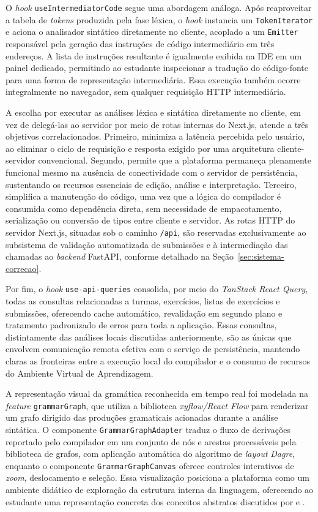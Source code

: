 O \textit{hook} \texttt{useIntermediatorCode} segue uma abordagem análoga. Após reaproveitar a tabela de \textit{tokens} produzida pela fase léxica, o \textit{hook} instancia um \texttt{TokenIterator} e aciona o analisador sintático diretamente no cliente, acoplado a um \texttt{Emitter} responsável pela geração das instruções de código intermediário em três endereços. A lista de instruções resultante é igualmente exibida na IDE em um painel dedicado, permitindo ao estudante inspecionar a tradução do código-fonte para uma forma de representação intermediária. Essa execução também ocorre integralmente no navegador, sem qualquer requisição HTTP intermediária.

A escolha por executar as análises léxica e sintática diretamente no cliente, em vez de delegá-las ao servidor por meio de rotas internas do Next.js, atende a três objetivos correlacionados. Primeiro, minimiza a latência percebida pelo usuário, ao eliminar o ciclo de requisição e resposta exigido por uma arquitetura cliente-servidor convencional. Segundo, permite que a plataforma permaneça plenamente funcional mesmo na ausência de conectividade com o servidor de persistência, sustentando os recursos essenciais de edição, análise e interpretação. Terceiro, simplifica a manutenção do código, uma vez que a lógica do compilador é consumida como dependência direta, sem necessidade de empacotamento, serialização ou conversão de tipos entre cliente e servidor. As rotas HTTP do servidor Next.js, situadas sob o caminho \texttt{/api}, são reservadas exclusivamente ao subsistema de validação automatizada de submissões e à intermediação das chamadas ao \textit{backend} FastAPI, conforme detalhado na Seção~\ref{sec:sistema-correcao}.

Por fim, o \textit{hook} \texttt{use-api-queries} consolida, por meio do \textit{TanStack React Query}, todas as consultas relacionadas a turmas, exercícios, listas de exercícios e submissões, oferecendo cache automático, revalidação em segundo plano e tratamento padronizado de erros para toda a aplicação. Essas consultas, distintamente das análises locais discutidas anteriormente, são as únicas que envolvem comunicação remota efetiva com o serviço de persistência, mantendo claras as fronteiras entre a execução local do compilador e o consumo de recursos do Ambiente Virtual de Aprendizagem.

A representação visual da gramática reconhecida em tempo real foi modelada na \textit{feature} \texttt{grammarGraph}, que utiliza a biblioteca \textit{xyflow/React Flow} para renderizar um grafo dirigido das produções gramaticais acionadas durante a análise sintática. O componente \texttt{GrammarGraphAdapter} traduz o fluxo de derivações reportado pelo compilador em um conjunto de nós e arestas processáveis pela biblioteca de grafos, com aplicação automática do algoritmo de \textit{layout} \textit{Dagre}, enquanto o componente \texttt{GrammarGraphCanvas} oferece controles interativos de \textit{zoom}, deslocamento e seleção. Essa visualização posiciona a plataforma como um ambiente didático de exploração da estrutura interna da linguagem, oferecendo ao estudante uma representação concreta dos conceitos abstratos discutidos por  e .

